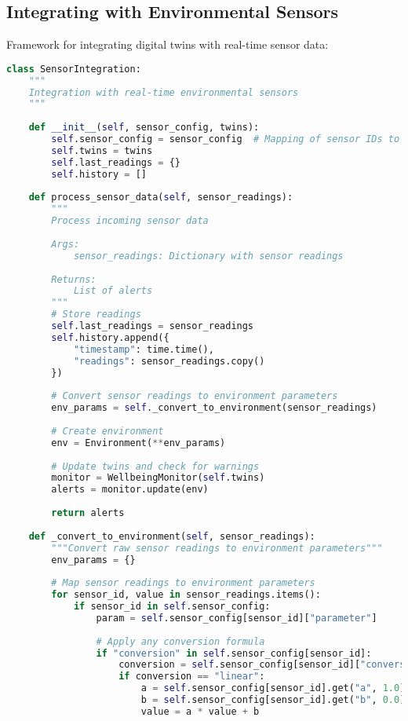 \documentclass[11pt,a4paper]{article}
\begin{document}
\subsection{Integrating with Environmental Sensors}
Framework for integrating digital twins with real-time sensor data:

\begin{lstlisting}[language=Python]
class SensorIntegration:
    """
    Integration with real-time environmental sensors
    """
    
    def __init__(self, sensor_config, twins):
        self.sensor_config = sensor_config  # Mapping of sensor IDs to parameters
        self.twins = twins
        self.last_readings = {}
        self.history = []
        
    def process_sensor_data(self, sensor_readings):
        """
        Process incoming sensor data
        
        Args:
            sensor_readings: Dictionary with sensor readings
            
        Returns:
            List of alerts
        """
        # Store readings
        self.last_readings = sensor_readings
        self.history.append({
            "timestamp": time.time(),
            "readings": sensor_readings.copy()
        })
        
        # Convert sensor readings to environment parameters
        env_params = self._convert_to_environment(sensor_readings)
        
        # Create environment
        env = Environment(**env_params)
        
        # Update twins and check for warnings
        monitor = WellbeingMonitor(self.twins)
        alerts = monitor.update(env)
        
        return alerts
        
    def _convert_to_environment(self, sensor_readings):
        """Convert raw sensor readings to environment parameters"""
        env_params = {}
        
        # Map sensor readings to environment parameters
        for sensor_id, value in sensor_readings.items():
            if sensor_id in self.sensor_config:
                param = self.sensor_config[sensor_id]["parameter"]
                
                # Apply any conversion formula
                if "conversion" in self.sensor_config[sensor_id]:
                    conversion = self.sensor_config[sensor_id]["conversion"]
                    if conversion == "linear":
                        a = self.sensor_config[sensor_id].get("a", 1.0)
                        b = self.sensor_config[sensor_id].get("b", 0.0)
                        value = a * value + b
                

\end{lstlisting}
\end{document}
